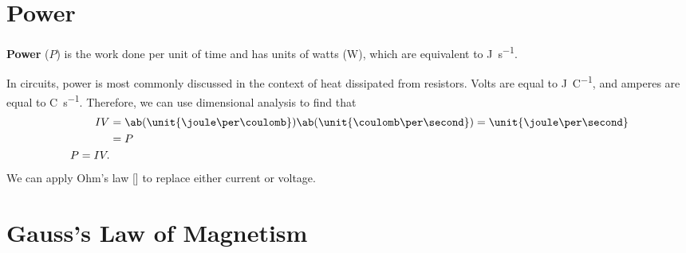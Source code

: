 \section{Power}

\textbf{Power} (\(P\)) is the work done per unit of time
and has units of watts (\unit{\watt}),
which are equivalent to \unit{\joule \per \second}.

In circuits,
power is most commonly discussed in the context of heat dissipated
from resistors.
Volts are equal to \unit{\joule \per \coulomb},
and amperes are equal to \unit{\coulomb \per \second}.
Therefore, we can use dimensional analysis to find that
\begin{equation}
  \begin{aligned}
    I V
    &= \ab( \unit{\joule \per \coulomb} ) \ab( \unit{\coulomb
    \per \second} )
    = \unit{\joule \per \second} \\
    &= P \\
    P = I V.
  \end{aligned}
\end{equation}
We can apply Ohm's law [] to replace either
current or voltage.

\section{Gauss's Law of Magnetism}
